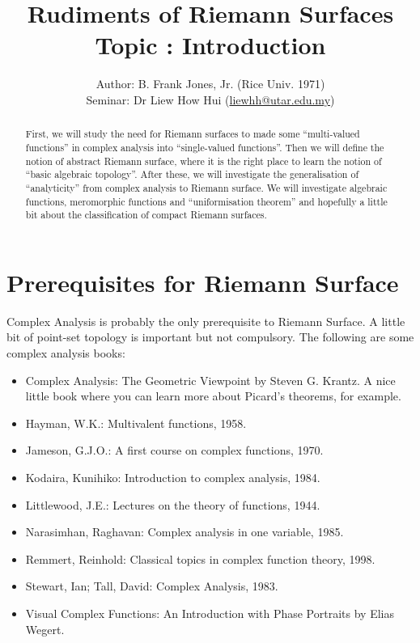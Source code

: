 \documentclass[a4paper,11pt]{article}
\newcounter{topic}
\begin{document}
\title{{\sc Rudiments of Riemann Surfaces\\
    Topic \thetopic{}: Introduction}}
\author{Author: B. Frank Jones, Jr. (Rice Univ. 1971)\\
Seminar: Dr Liew How Hui (\url{liewhh@utar.edu.my})}
\date{}

\maketitle

\begin{abstract}
  First, we will study the need for Riemann surfaces to made some
  ``multi-valued functions'' in complex analysis into ``single-valued
  functions''.  Then we will define the notion of abstract Riemann
  surface, where it is the right place to learn the notion of
  ``basic algebraic topology''.  After these, we will investigate the
  generalisation of ``analyticity'' from complex analysis to Riemann
  surface.  We will investigate algebraic functions, meromorphic
  functions and ``uniformisation theorem'' and hopefully a little bit
  about the classification of compact Riemann surfaces.
\end{abstract}

\tableofcontents

\section{Prerequisites for Riemann Surface}

Complex Analysis is probably the only prerequisite to Riemann
Surface.  A little bit of point-set topology is important but not
compulsory.  The following are some complex analysis books:
\begin{itemize}
\item Complex Analysis: The Geometric Viewpoint by Steven G. Krantz. A
  nice little book where you can learn more about Picard's theorems,
  for example.
\item Hayman, W.K.: Multivalent functions, 1958.
\item Jameson, G.J.O.: A first course on complex functions, 1970.
\item Kodaira, Kunihiko: Introduction to complex analysis, 1984.
\item Littlewood, J.E.: Lectures on the theory of functions, 1944.
\item Narasimhan, Raghavan: Complex analysis in one variable, 1985.
\item Remmert, Reinhold: Classical topics in complex function theory,
  1998.
\item Stewart, Ian; Tall, David: Complex Analysis, 1983.
\item Visual Complex Functions: An Introduction with Phase Portraits
  by Elias Wegert.
\end{itemize}
\end{document}
